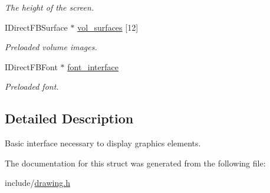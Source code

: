 \begin{DoxyCompactItemize}
\begin{DoxyCompactList}\small\item\em The height of the screen. \end{DoxyCompactList}\item 
I\+Direct\+F\+B\+Surface $\ast$ \hyperlink{structdraw__interface_a4c1f582446caaf6cb41036c9b098a5b8}{vol\+\_\+surfaces} \mbox{[}12\mbox{]}\hypertarget{structdraw__interface_a4c1f582446caaf6cb41036c9b098a5b8}{}\label{structdraw__interface_a4c1f582446caaf6cb41036c9b098a5b8}

\begin{DoxyCompactList}\small\item\em Preloaded volume images. \end{DoxyCompactList}\item 
I\+Direct\+F\+B\+Font $\ast$ \hyperlink{structdraw__interface_a80a7d59b777117c931013dd81c6c7b9f}{font\+\_\+interface}\hypertarget{structdraw__interface_a80a7d59b777117c931013dd81c6c7b9f}{}\label{structdraw__interface_a80a7d59b777117c931013dd81c6c7b9f}

\begin{DoxyCompactList}\small\item\em Preloaded font. \end{DoxyCompactList}\end{DoxyCompactItemize}


\subsection{Detailed Description}
Basic interface necessary to display graphics elements. 

The documentation for this struct was generated from the following file\+:\begin{DoxyCompactItemize}
\item 
include/\hyperlink{drawing_8h}{drawing.\+h}\end{DoxyCompactItemize}
